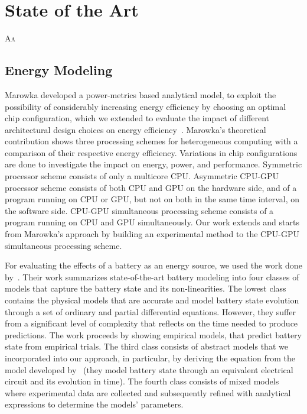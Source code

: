 
\chapter{State of the Art}


\lettrine{A}{a}


\section{Energy Modeling}
\label{cp:soa:ene-mod}

Marowka developed a power-metrics based analytical model, to exploit the possibility of considerably increasing energy efficiency by choosing an optimal chip configuration, which we extended to evaluate the impact of different architectural design choices on energy efficiency~\citep{marowka2017energy}. Marowka's theoretical contribution shows three processing schemes for heterogeneous computing with a comparison of their respective energy efficiency. Variations in chip configurations are done to investigate the impact on energy, power, and performance. Symmetric processor scheme consists of only a multicore CPU. Asymmetric CPU-GPU processor scheme consists of both CPU and GPU on the hardware side, and of a program running on CPU or GPU, but not on both in the same time interval, on the software side. CPU-GPU simultaneous processing scheme consists of a program running on CPU and GPU simultaneously. Our work extends and starts from Marowka's approach by building an experimental method to the CPU-GPU simultaneous processing scheme.

For evaluating the effects of a battery as an energy source, we used the work done by~\citep{rao2003battery}. Their work summarizes state-of-the-art battery modeling into four classes of models that capture the battery state and its non-linearities. The lowest class contains the physical models that are accurate and model battery state evolution through a set of ordinary and partial differential equations. However, they suffer from a significant level of complexity that reflects on the time needed to produce predictions. The work proceeds by showing empirical models, that predict battery state from empirical trials. The third class consists of abstract models that we incorporated into our approach, in particular, by deriving the equation from the model developed by~\citep{hasan2018exogenous} (they model battery state through an equivalent electrical circuit and its evolution in time). The fourth class consists of mixed models where experimental data are collected and subsequently refined with analytical expressions to determine the models' parameters.

